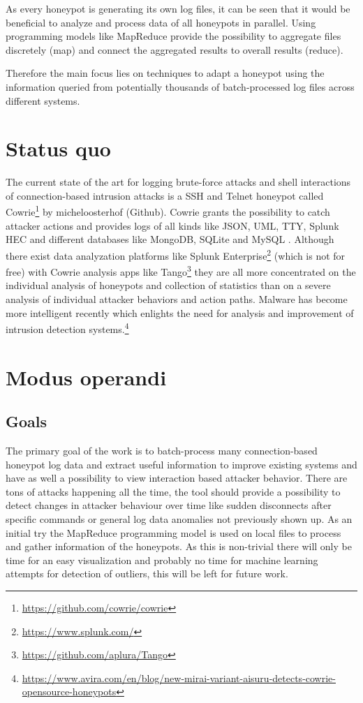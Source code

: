 \documentclass[fontsize=11pt, paper=a4, parskip=half]{scrartcl}
\begin{document}
As every honeypot is generating its own log files, it can be seen that it would be beneficial to analyze and process data of all honeypots in parallel. Using programming models like MapReduce \cite{62} provide the possibility to aggregate files discretely (map) and  connect the aggregated results to overall results (reduce). 

Therefore the main focus lies on techniques to adapt a honeypot using the information queried from potentially thousands of batch-processed log files across different systems.

\pagebreak
\section{Status quo}
The current state of the art for logging brute-force attacks and shell interactions of connection-based intrusion attacks is a SSH and Telnet honeypot called Cowrie\footnote{\url{https://github.com/cowrie/cowrie}} by micheloosterhof (Github). Cowrie grants the possibility to catch attacker actions and provides logs  of all kinds like JSON, UML, TTY, Splunk HEC and different databases like MongoDB, SQLite and MySQL \cite{cowrie:artefacts}. Although there exist data analyzation platforms like Splunk Enterprise\footnote{\url{https://www.splunk.com/}} (which is not for free) with Cowrie analysis apps like Tango\footnote{\url{https://github.com/aplura/Tango}} they are all more concentrated on the individual analysis of honeypots and collection of statistics than on a severe analysis of individual attacker behaviors and action paths. Malware has become more intelligent recently which enlights the need for analysis and improvement of intrusion detection systems.\footnote{\url{https://www.avira.com/en/blog/new-mirai-variant-aisuru-detects-cowrie-opensource-honeypots}}

\section{Modus operandi}
\subsection{Goals}
The primary goal of the work is to batch-process many connection-based honeypot log data and extract useful information to improve existing systems and have as well a possibility to view interaction based attacker behavior. There are tons of attacks happening all the time, the tool should provide a possibility to detect changes in attacker behaviour over time like sudden disconnects after specific commands or general log data anomalies not previously shown up. As an initial try the MapReduce programming model \cite{62} is used on local files to process and gather information of the honeypots. As this is non-trivial there will only be time for an easy visualization and probably no time for machine learning attempts for detection of outliers, this will be left for future work. 
\end{document}
